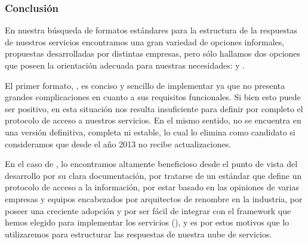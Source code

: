 \subsubsection{Conclusión}

En nuestra búsqueda de formatos estándares para la estructura de la respuestas de nuestros servicios encontramos una gran variedad de opciones informales, propuestas desarrolladas por distintas empresas, pero sólo hallamos dos opciones que poseen la orientación adecuada para nuestras necesidades:  y .

El primer formato, , es conciso y sencillo de implementar ya que no presenta grandes complicaciones en cuanto a sus requisitos funcionales. Si bien esto puede ser positivo, en esta situación nos resulta insuficiente para definir por completo el protocolo de acceso a nuestros servicios. En el mismo sentido,  no se encuentra en una versión definitiva, completa ni estable, lo cual lo elimina como candidato si consideramos que desde el año 2013 no recibe actualizaciones.

En el caso de , lo encontramos altamente beneficioso desde el punto de vista del desarrollo por su clara documentación, por tratarse de un estándar que define un protocolo de acceso a la información, por estar basado en las opiniones de varias empresas y equipos encabezados por arquitectos de renombre en la industria, por poseer una creciente adopción y por ser fácil de integrar con el framework que hemos elegido para implementar los servicios (), y es por estos motivos que lo utilizaremos para estructurar las respuestas de nuestra nube de servicios.
